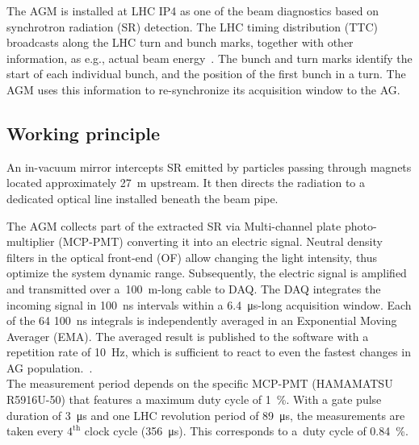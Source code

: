 %
The AGM is installed at LHC IP4 as one of the beam diagnostics based on synchrotron radiation (SR) detection. %
%
The LHC timing distribution (TTC) broadcasts along the LHC turn and bunch marks, together with other information, as e.g., actual beam energy~\cite{ttc_distribution}.
%
The bunch and turn marks identify the start of each individual bunch, and the position of the first bunch in a turn.   
%
The AGM uses this information to re-synchronize its acquisition window to the AG.
%
\subsection{Working principle}
%
An in-vacuum mirror intercepts  SR  emitted by particles passing through magnets located approximately \SI{27}{m} upstream. It then directs the radiation to a dedicated optical line installed beneath the beam pipe.

%
The AGM collects part of the extracted SR via Multi-channel plate photo-multiplier (MCP-PMT) converting it into an electric signal.
%
Neutral density filters in the optical front-end (OF) allow  changing the light intensity, thus optimize the system dynamic range.
% 
Subsequently, the electric signal is amplified and transmitted over a~\SI{100}{m}-long cable to DAQ.
%
The DAQ integrates the incoming signal in \SI{100}{\nano\second} intervals within a \SI{6.4}{\micro\second}-long acquisition window.
%
Each of the 64 \SI{100}{\nano\second} integrals is independently averaged in an Exponential Moving Averager (EMA).
%
The averaged result is published to the software with a repetition rate of \SI{10}{Hz}, which is sufficient to react to even the fastest changes in AG population.~\cite{high_sensitivity_measurement}.
%
\\
The measurement period depends on the specific MCP-PMT (HAMAMATSU R5916U-50) that features a maximum duty cycle of \SI{1}{\%}. 
%
%
%
With a gate pulse duration of \SI{3}{\micro\second} and one LHC revolution period of \SI{89}{\micro\second}, the measurements are taken every $4^{\text{th}}$ clock cycle (\SI{356}{\micro\second}).
%
This corresponds to a~duty cycle of \SI{0.84}{\%}.
\\
%

